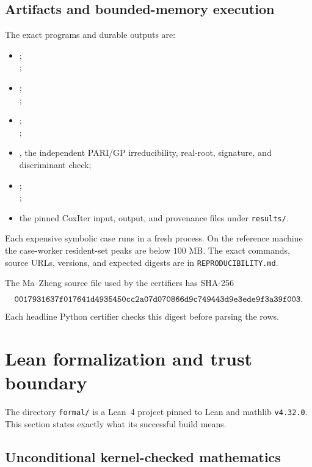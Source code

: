 \documentclass[11pt]{article}
\numberwithin{equation}{section}
\theoremstyle{definition}
\theoremstyle{remark}
\newcommand{\code}[1]{\texttt{#1}}
\begin{document}
\subsection{Artifacts and bounded-memory execution}

The exact programs and durable outputs are:
\begin{itemize}[leftmargin=2em]
\item {};\\
  ;
\item {};\\
  ;
\item {};\\
  ;
\item {}, the independent PARI/GP
  irreducibility, real-root, signature, and discriminant check;
\item {};\\
  ;
\item the pinned CoxIter input, output, and provenance files under
  \code{results/}.
\end{itemize}
Each expensive symbolic case runs in a fresh process.  On the reference
machine the case-worker resident-set peaks are below \(100\) MB.  The exact
commands, source URLs, versions, and expected digests are in
\code{REPRODUCIBILITY.md}.

The Ma--Zheng source file used by the certifiers has SHA-256
\[
\text{\code{0017931637f017641d4935450cc2a07d070866d9c749443d9e3ede9f3a39f003}}.
\]
Each headline Python certifier checks this digest before parsing the rows.

\section{Lean formalization and trust boundary}
\label{sec:lean}

The directory \code{formal/} is a Lean~4 project pinned to Lean and mathlib
\code{v4.32.0}.  This section states exactly what its successful build means.

\subsection{Unconditional kernel-checked mathematics}
\end{document}
